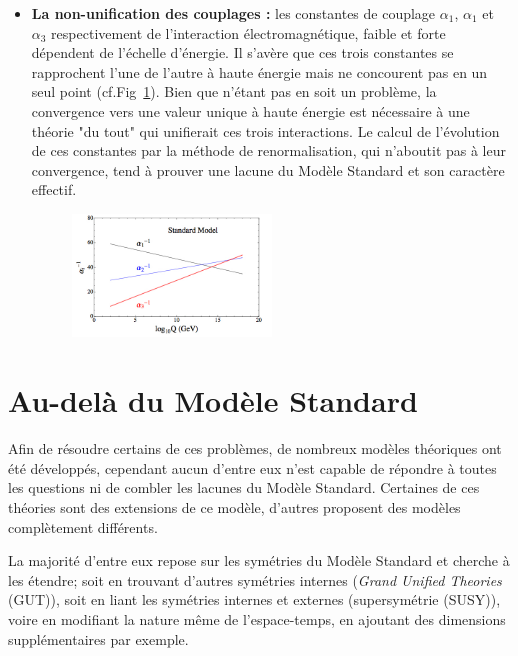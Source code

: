 \begin{itemize}[label=$\bullet$]
\item \textbf{La non-unification des couplages : }les constantes de couplage $\alpha_{1}$, $\alpha_{1}$ et $\alpha_{3}$ respectivement de l'interaction électromagnétique, faible et forte dépendent de l'échelle d'énergie. Il s'avère que ces trois constantes se rapprochent l'une de l'autre à haute énergie mais ne concourent pas en un seul point (cf.Fig~\ref{constantes}). Bien que n'étant pas en soit un problème, la convergence vers une valeur unique à haute énergie est nécessaire à une théorie "du tout" qui unifierait ces trois interactions. Le calcul de l'évolution de ces constantes par la méthode de renormalisation, qui n'aboutit pas à leur convergence, tend à prouver une lacune du Modèle Standard et son caractère effectif.
\begin{figure}[ht!]
\centering
\includegraphics[width=0.50\textwidth]{SM/couplageSM.jpg}
\label{constantes}
\end{figure}
\end{itemize}

\section{Au-delà du Modèle Standard}
Afin de résoudre certains de ces problèmes, de nombreux modèles théoriques ont été développés, cependant aucun d'entre eux n'est capable de répondre à toutes les questions ni de combler les lacunes du Modèle Standard. Certaines de ces théories sont des extensions de ce modèle, d'autres proposent des modèles complètement différents.

La majorité d'entre eux repose sur les symétries du Modèle Standard et cherche à les étendre; soit en trouvant d'autres symétries internes (\textit{Grand Unified Theories} (GUT)), soit en liant les symétries internes et externes (supersymétrie (SUSY)), voire en modifiant la nature même de l'espace-temps, en ajoutant des dimensions supplémentaires par exemple.

